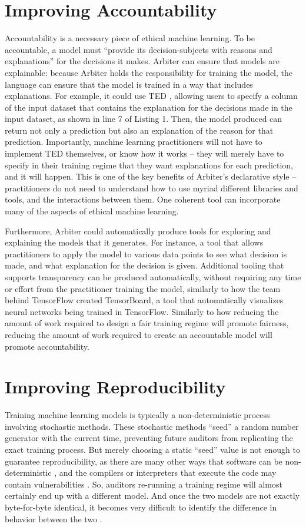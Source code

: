 \documentclass[sigconf]{acmart}
\begin{document}
\section{Improving Accountability}
Accountability is a necessary piece of ethical machine learning. To be accountable, a model must ``provide its decision-subjects with reasons and explanations'' \citep{Binns2017} for the decisions it makes. Arbiter can ensure that models are explainable: because Arbiter holds the responsibility for training the model, the language can ensure that the model is trained in a way that includes explanations. For example, it could use TED \citep{Hind2019}, allowing users to specify a column of the input dataset that contains the explanation for the decisions made in the input dataset, as shown in line 7 of Listing 1. Then, the model produced can return not only a prediction but also an explanation of the reason for that prediction. Importantly, machine learning practitioners will not have to implement TED themselves, or know how it works -- they will merely have to specify in their training regime that they want explanations for each prediction, and it will happen. This is one of the key benefits of Arbiter's declarative style -- practitioners do not need to understand how to use myriad different libraries and tools, and the interactions between them. One coherent tool can incorporate many of the aspects of ethical machine learning.

Furthermore, Arbiter could automatically produce tools for exploring and explaining the models that it generates. For instance, a tool that allows practitioners to apply the model to various data points to see what decision is made, and what explanation for the decision is given. Additional tooling that supports transparency can be produced automatically, without requiring any time or effort from the practitioner training the model, similarly to how the team behind TensorFlow created TensorBoard, a tool that automatically visualizes neural networks being trained in TensorFlow. Similarly to how reducing the amount of work required to design a fair training regime will promote fairness, reducing the amount of work required to create an accountable model will promote accountability.

\section{Improving Reproducibility}
Training machine learning models is typically a non-deterministic process involving stochastic methods. These stochastic methods ``seed'' a random number generator with the current time, preventing future auditors from replicating the exact training process. But merely choosing a static ``seed'' value is not enough to guarantee reproducibility, as there are many other ways that software can be non-deterministic \citep{Maste2017}, and the compilers or interpreters that execute the code may contain vulnerabilities \citep{Thompson1984}. So, auditors re-running a training regime will almost certainly end up with a different model. And once the two models are not exactly byte-for-byte identical, it becomes very difficult to identify the difference in behavior between the two \citep{Perry2014}.
\end{document}
